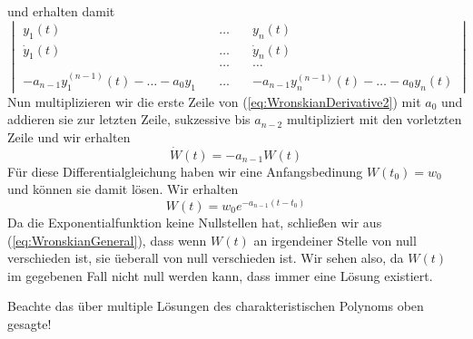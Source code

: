 und erhalten damit
\begin{equation}
  \begin{vmatrix}
           y_1(t)&\quad\dots\quad &y_n(t)\\
           \dot{y}_1(t)&\quad\dots\quad &\dot{y}_n(t)\\
                       &\quad\dots\quad&\dots\\
      -a_{n-1}y^{(n-1)}_1(t)-\dots-a_0y_1&\quad\dots\quad 
      &-a_{n-1}y^{(n-1)}_n(t)-\dots-a_0y_n(t)
         \end{vmatrix}
  \label{eq:WronskianDerivative2}
\end{equation}
Nun multiplizieren wir die erste Zeile von (\ref{eq:WronskianDerivative2}) mit
$a_0$ und addieren sie zur letzten Zeile, sukzessive bis $a_{n-2}$
multipliziert mit den vorletzten Zeile und wir erhalten
\begin{equation}
  \dot{W}(t)=-a_{n-1}W(t)
  \label{eq:WronskianDGL}
\end{equation}
Für diese Differentialgleichung haben wir eine Anfangsbedinung $W(t_0)=w_0$ und
können sie damit lösen. Wir erhalten
\begin{equation}
  W(t)=w_0e^{-a_{n-1}(t-t_0)}
  \label{eq:WronskianGeneral}
\end{equation}
Da die Exponentialfunktion keine Nullstellen hat, schließen wir aus
(\ref{eq:WronskianGeneral}), dass wenn $W(t)$ an irgendeiner Stelle von null
verschieden ist, sie üeberall von null verschieden ist. Wir sehen also, da
$W(t)$ im gegebenen Fall nicht null werden kann, dass immer eine Lösung
existiert.
\begin{note}{}
  Beachte das über multiple Lösungen des charakteristischen Polynoms oben
  gesagte!
\end{note}